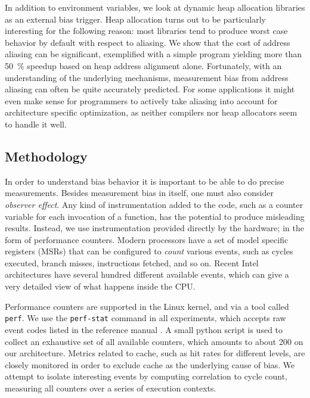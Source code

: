 \documentclass[a4paper,10pt,twocolumn,twoside]{article}
\begin{document}
In addition to environment variables, we look at dynamic heap allocation libraries as an external bias trigger.
Heap allocation turns out to be particularly interesting for the following reason: most libraries tend to produce worst case behavior by default with respect to aliasing.
We show that the cost of address aliasing can be significant, exemplified with a simple program yielding more than 50~\% speedup based on heap address alignment alone.
Fortunately, with an understanding of the underlying mechanisms, measurement bias from address aliasing can often be quite accurately predicted.
For some applications it might even make sense for programmers to actively take aliasing into account for architecture specific optimization, as neither compilers nor heap allocators seem to handle it well.





\subsection{Methodology}

In order to understand bias behavior it is important to be able to do precise measurements.
Besides measurement bias in itself, one must also consider \emph{observer effect}.
Any kind of instrumentation added to the code, such as a counter variable for each invocation of a function, has the potential to produce misleading results.
Instead, we use instrumentation provided directly by the hardware; in the form of performance counters. 
Modern processors have a set of model specific registers (MSRs) that can be configured to \emph{count} various events, such as cycles executed, branch misses, instructions fetched, and so on.
Recent Intel architectures have several hundred different available events, which can give a very detailed view of what happens inside the CPU.

Performance counters are supported in the Linux kernel, and via a tool called \texttt{perf}. 
We use the \texttt{perf-stat} command in all experiments, which accepts raw event codes listed in the reference manual \cite{Intel:2013:Volume3B}.
A small python script is used to collect an exhaustive set of all available counters, which amounts to about 200 on our architecture.
Metrics related to cache, such as hit rates for different levels, are closely monitored in order to exclude cache as the underlying cause of bias.
We attempt to isolate interesting events by computing correlation to cycle count, measuring all counters over a series of execution contexts.
\end{document}
